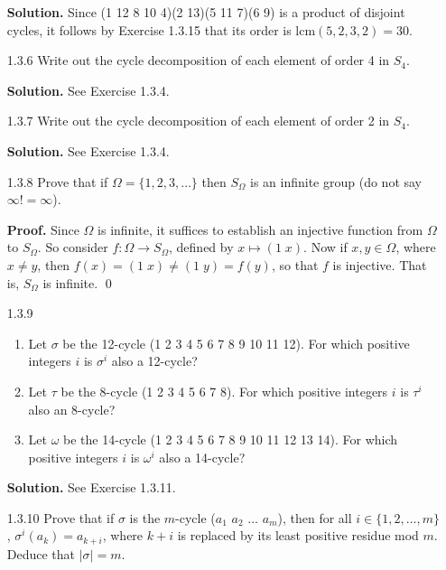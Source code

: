 \begin{enumerate}
      \textbf{Solution.} Since (1 12 8 10 4)(2 13)(5 11 7)(6 9) is a product of
      disjoint cycles, it follows by Exercise 1.3.15 that its order is
      lcm$(5, 2, 3, 2) = 30$.
   \item[1.3.6]   Write out the cycle decomposition of each element of order 4
                  in $S_4$.

      \textbf{Solution.} See Exercise 1.3.4.
   \item[1.3.7]   Write out the cycle decomposition of each element of order 2
                  in $S_4$.

      \textbf{Solution.} See Exercise 1.3.4.
   \item[1.3.8]   Prove that if $\Omega = \{1, 2, 3, \ldots\}$ then $S_\Omega$
                  is an infinite group (do not say $\infty! = \infty$).

      \textbf{Proof.} Since $\Omega$ is infinite, it suffices to establish an
      injective function from $\Omega$ to $S_\Omega$. So consider
      $f : \Omega \rightarrow S_\Omega$, defined by $x \mapsto (1\;x)$. Now if
      $x, y \in \Omega$, where $x \neq y$, then
      $f(x) = (1\;x) \neq (1\;y) = f(y)$, so that $f$ is injective. That is,
      $S_\Omega$ is infinite. \qed
   \item[1.3.9]   \begin{enumerate}
                     \item Let $\sigma$ be the 12-cycle
                           (1 2 3 4 5 6 7 8 9 10 11 12). For which positive
                           integers $i$ is $\sigma^i$ also a 12-cycle?
                     \item Let $\tau$ be the 8-cycle (1 2 3 4 5 6 7 8). For
                           which positive integers $i$ is $\tau^i$ also an
                           8-cycle?
                     \item Let $\omega$ be the 14-cycle
                           (1 2 3 4 5 6 7 8 9 10 11 12 13 14). For which
                           positive integers $i$ is $\omega^i$ also a 14-cycle?
                  \end{enumerate}

      \textbf{Solution.} See Exercise 1.3.11.
   \item[1.3.10]  Prove that if $\sigma$ is the $m$-cycle
                  ($a_1$ $a_2$ $\ldots$ $a_m$), then for all
                  $i \in \{1, 2, \ldots, m\}$, $\sigma^i(a_k) = a_{k+i}$,
                  where $k + i$ is replaced by its least positive residue mod
                  $m$. Deduce that $|\sigma| = m$.


\end{enumerate}
